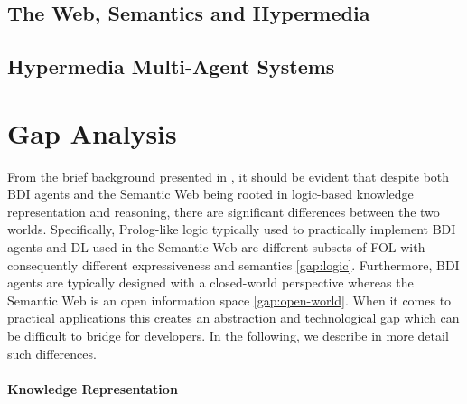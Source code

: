 \documentclass[
]{ceurart}
\begin{document}
\subsection{The Web, Semantics and Hypermedia}


\subsection{Hypermedia Multi-Agent Systems}


\section{Gap Analysis}
\label{sec:gap-analysis}

From the brief background presented in , 
it should be evident that
despite both \ac{BDI} agents and the Semantic Web being rooted in logic-based knowledge representation and reasoning,
there are significant differences between the two worlds.
Specifically, Prolog-like logic typically used to practically implement \ac{BDI} agents and \ac{DL} used in the Semantic Web are different subsets of \ac{FOL} with consequently different expressiveness and semantics \ref{gap:logic}.
%
Furthermore, \ac{BDI} agents are typically designed with a closed-world perspective whereas the Semantic Web is an open information space \ref{gap:open-world}.
%
When it comes to practical applications this creates an abstraction and technological gap
which can be difficult to bridge for developers.
%
In the following, we describe in more detail such differences.

\paragraph{Knowledge Representation}
\end{document}
